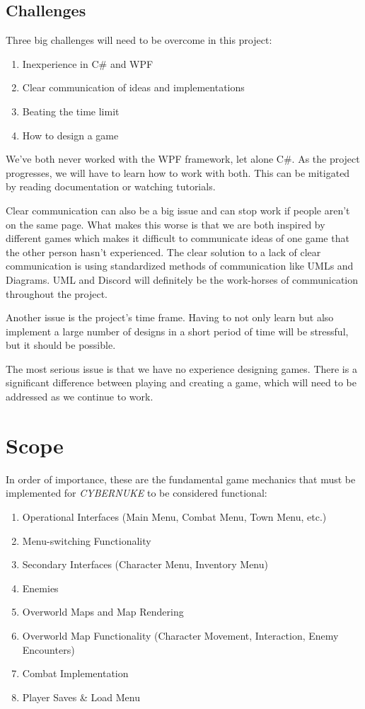 \documentclass[10pt,conference,onecolumn,compsoc]{IEEEtran}
\begin{document}
\subsection{Challenges}
Three big challenges will need to be overcome in this project:
\begin{enumerate}
\item Inexperience in C\# and WPF
\item Clear communication of ideas and implementations
\item Beating the time limit
\item How to design a game
\end{enumerate}
We've both never worked with the WPF framework, let alone C\#. As the project progresses, we will have to learn how to work with both. This can be mitigated by reading documentation or watching tutorials.

Clear communication can also be a big issue and can stop work if people aren't on the same page. What makes this worse is that we are both inspired by different games which makes it difficult to communicate ideas of one game that the other person hasn't experienced. The clear solution to a lack of clear communication is using standardized methods of communication like UMLs and Diagrams. UML and Discord will definitely be the work-horses of communication throughout the project.

Another issue is the project's time frame. Having to not only learn but also implement a large number of designs in a short period of time will be stressful, but it should be possible.

The most serious issue is that we have no experience designing games. There is a significant difference between playing and creating a game, which will need to be addressed as we continue to work. 

\pagebreak
\section{Scope}
In order of importance, these are the fundamental game mechanics that must be implemented for \emph{CYBERNUKE} to be considered functional:
\begin{enumerate}
\item Operational Interfaces (Main Menu, Combat Menu, Town Menu, etc.)
\item Menu-switching Functionality
\item Secondary Interfaces (Character Menu, Inventory Menu)
\item Enemies
\item Overworld Maps and Map Rendering
\item Overworld Map Functionality (Character Movement, Interaction, Enemy Encounters)
\item Combat Implementation
\item Player Saves \& Load Menu
\end{enumerate}
\end{document}
